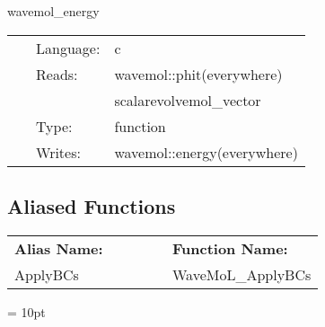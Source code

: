 \vspace{5mm}


\hspace{5mm} wavemol\_energy 

\hspace{5mm}{\it calculate the energy } 


\hspace{5mm}

 \begin{tabular*}{160mm}{cll} 
~ & Language:  & c \\ 
~ & Reads:  & wavemol::phit(everywhere) \\ 
~& ~ &scalarevolvemol\_vector\\ 
~ & Type:  & function \\ 
~ & Writes:  & wavemol::energy(everywhere) \\ 
\end{tabular*} 


\subsection*{Aliased Functions}

\hspace{5mm}

 \begin{tabular*}{160mm}{ll} 

{\bf Alias Name:} ~~~~~~~ & {\bf Function Name:} \\ 
ApplyBCs & WaveMoL\_ApplyBCs \\ 
\end{tabular*} 



\vspace{5mm}\parskip = 10pt 

